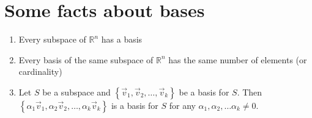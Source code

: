 \section{\small Some facts about bases}
\begin{enumerate}[label=(\roman*)]
	\item Every subspace of $\mathbb{R}^n$ has a basis
	\item Every basis of the same subspace of $\mathbb{R}^n$ has the same number of
	      elements (or cardinality)
	\item Let $S$ be a subspace and $\left\{ \vec{v}_1,
		      \vec{v}_2, \ldots, \vec{v}_k \right\}$ be a basis for $S$. Then
	      $\left\{ \alpha_1 \vec{v}_1, \alpha_2 \vec{v}_2, \ldots, \alpha_k
		      \vec{v}_k \right\}$ is a basis for $S$ for any $\alpha_1, \alpha_2,
		      \ldots \alpha_k \neq 0$.
\end{enumerate}
